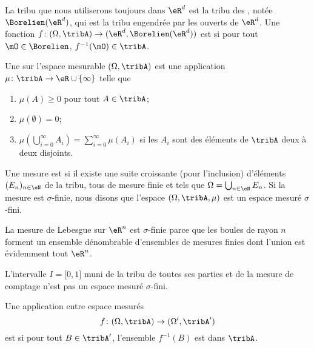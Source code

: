La tribu que nous utiliserons toujours dans \( \eR^d\) est la tribu des , notée \( \Borelien(\eR^d)\), qui est la tribu engendrée par les ouverts de \( \eR^d\). Une fonction \( f\colon (\Omega,\tribA)\to (\eR^d,\Borelien(\eR^d))\) est  si pour tout \( \mO\in\Borelien\), \( f^{-1}(\mO)\in\tribA\).

\begin{definition}
    Une  sur l'espace mesurable \( (\Omega,\tribA)\) est une application \( \mu\colon \tribA\to \eR\cup\{ \infty \}\) telle que
    \begin{enumerate}
        \item
            \( \mu(A)\geq 0\) pour tout \( A\in\tribA\);
        \item
            \( \mu(\emptyset)=0\);
        \item
            \( \mu\left( \bigcup_{i=0}^{\infty}A_i\right)=\sum_{i=0}^{\infty}\mu(A_i)\) si les \( A_i\) sont des éléments de \( \tribA\) deux à deux disjoints.
    \end{enumerate}
    Une mesure est  si il existe une suite croissante (pour l'inclusion) d'éléments \( (E_n)_{n\in\eN}\) de la tribu, tous de mesure finie et tels que \( \Omega=\bigcup_{n\in \eN}E_n\). Si la mesure est $\sigma$-finie, nous disons que l'espace \( (\Omega,\tribA,\mu)\) est un espace mesuré $\sigma$-fini.
\end{definition}

\begin{example}
    La mesure de Lebesgue sur \( \eR^n\) est \( \sigma\)-finie parce que les boules de rayon \( n\) forment un ensemble dénombrable d'ensembles de mesures finies dont l'union est évidemment tout \( \eR^n\).

    L'intervalle \( I=\mathopen[ 0 , 1 \mathclose]\) muni de la tribu de toutes ses parties et de la mesure de comptage n'est pas un espace mesuré \( \sigma\)-fini.
\end{example}

\begin{definition}
    Une application entre espace mesurés
    \begin{equation}
        f\colon (\Omega,\tribA)\to (\Omega',\tribA')
    \end{equation}
    est  si pour tout \( B\in\tribA'\), l'ensemble \( f^{-1}(B)\) est dans \( \tribA\).
\end{definition}

